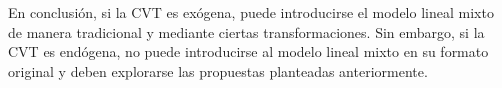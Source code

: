 \documentclass[spanish]{article}
\numberwithin{figure}{subsection}
\numberwithin{equation}{subsection}
\numberwithin{table}{subsection}
\begin{document}


En conclusión, si la CVT es exógena, puede introducirse el modelo lineal mixto
de manera tradicional y mediante ciertas transformaciones. Sin embargo, si la
CVT es endógena, no puede introducirse al modelo lineal mixto en su formato
original y deben explorarse las propuestas planteadas anteriormente. 
\end{document}
